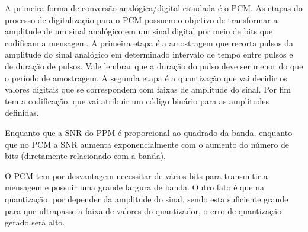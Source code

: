 \begin{subquestion}
    \item A primeira forma de conversão analógica/digital estudada é o PCM. As etapas do processo de digitalização para o PCM possuem o objetivo de transformar a amplitude de um sinal analógico em um sinal digital por meio de bits que codificam a mensagem. A primeira etapa é a amostragem que recorta pulsos da amplitude do sinal analógico em determinado intervalo de tempo entre pulsos e de duração de pulsos. Vale lembrar que a duração do pulso deve ser menor do que o período de amostragem. A segunda etapa é a quantização que vai decidir os valores digitais que se correspondem com faixas de amplitude do sinal. Por fim tem a codificação, que vai atribuir um código binário para as amplitudes definidas.
    \item Enquanto que a SNR do PPM é proporcional ao quadrado da banda, enquanto que no PCM a SNR aumenta exponencialmente com o aumento do número de bits (diretamente relacionado com a banda).
    \item O PCM tem por desvantagem necessitar de vários bits para transmitir a mensagem e possuir uma grande largura de banda. Outro fato é que na quantização, por depender da amplitude do sinal, sendo esta suficiente grande para que ultrapasse a faixa de valores do quantizador, o erro de quantização gerado será alto.
\end{subquestion}